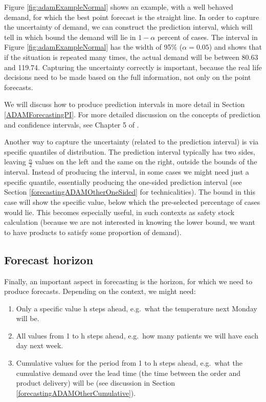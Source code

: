 \documentclass[
]{book}
\providecommand{\tightlist}{%
  \setlength{\itemsep}{0pt}\setlength{\parskip}{0pt}}
\theoremstyle{definition}
\theoremstyle{definition}
\theoremstyle{definition}
\theoremstyle{definition}
\theoremstyle{remark}
\begin{document}
Figure \ref{fig:adamExampleNormal} shows an example, with a well behaved demand, for which the best point forecast is the straight line. In order to capture the uncertainty of demand, we can construct the prediction interval, which will tell in which bound the demand will lie in \(1-\alpha\) percent of cases. The interval in Figure \ref{fig:adamExampleNormal} has the width of 95\% (\(\alpha=0.05\)) and shows that if the situation is repeated many times, the actual demand will be between 80.63 and 119.74. Capturing the uncertainty correctly is important, because the real life decisions need to be made based on the full information, not only on the point forecasts.

We will discuss how to produce prediction intervals in more detail in Section \ref{ADAMForecastingPI}. For more detailed discussion on the concepts of prediction and confidence intervals, see Chapter 5 of \citet{SvetunkovSBA}.

Another way to capture the uncertainty (related to the prediction interval) is via specific quantiles of distribution. The prediction interval typically has two sides, leaving \(\frac{\alpha}{2}\) values on the left and the same on the right, outside the bounds of the interval. Instead of producing the interval, in some cases we might need just a specific quantile, essentially producing the one-sided prediction interval (see Section \ref{forecastingADAMOtherOneSided} for technicalities). The bound in this case will show the specific value, below which the pre-selected percentage of cases would lie. This becomes especially useful, in such contexts as safety stock calculation (because we are not interested in knowing the lower bound, we want to have products to satisfy some proportion of demand).

\hypertarget{forecast-horizon}{%
\subsection{Forecast horizon}\label{forecast-horizon}}

Finally, an important aspect in forecasting is the horizon, for which we need to produce forecasts. Depending on the context, we might need:

\begin{enumerate}
\def\labelenumi{\arabic{enumi}.}
\tightlist
\item
  Only a specific value h steps ahead, e.g.~what the temperature next Monday will be.
\item
  All values from 1 to h steps ahead, e.g.~how many patients we will have each day next week.
\item
  Cumulative values for the period from 1 to h steps ahead, e.g.~what the cumulative demand over the lead time (the time between the order and product delivery) will be (see discussion in Section \ref{forecastingADAMOtherCumulative}).
\end{enumerate}
\end{document}
